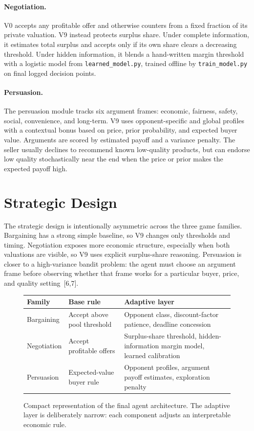 \documentclass{article}
\begin{document}
\paragraph{Negotiation.}
V0 accepts any profitable offer and otherwise counters from a fixed fraction of its private valuation. V9 instead protects surplus share. Under complete information, it estimates total surplus and accepts only if its own share clears a decreasing threshold. Under hidden information, it blends a hand-written margin threshold with a logistic model from \texttt{learned\_model.py}, trained offline by \texttt{train\_model.py} on final logged decision points.

\paragraph{Persuasion.}
The persuasion module tracks six argument frames: economic, fairness, safety, social, convenience, and long-term. V9 uses opponent-specific and global profiles with a contextual bonus based on price, prior probability, and expected buyer value. Arguments are scored by estimated payoff and a variance penalty. The seller usually declines to recommend known low-quality products, but can endorse low quality stochastically near the end when the price or prior makes the expected payoff high.

\section{Strategic Design}

The strategic design is intentionally asymmetric across the three game families. Bargaining has a strong simple baseline, so V9 changes only thresholds and timing. Negotiation exposes more economic structure, especially when both valuations are visible, so V9 uses explicit surplus-share reasoning. Persuasion is closer to a high-variance bandit problem: the agent must choose an argument frame before observing whether that frame works for a particular buyer, price, and quality setting~[6,7].

\begin{figure}[t]
\centering
\small
\begin{tabular}{>{\raggedright\arraybackslash}p{1.05in}>{\raggedright\arraybackslash}p{1.25in}p{2.95in}}
\toprule
Family & Base rule & Adaptive layer \\
\midrule
Bargaining & Accept above pool threshold & Opponent class, discount-factor patience, deadline concession \\
Negotiation & Accept profitable offers & Surplus-share threshold, hidden-information margin model, learned calibration \\
Persuasion & Expected-value buyer rule & Opponent profiles, argument payoff estimates, exploration penalty \\
\bottomrule
\end{tabular}
\caption{Compact representation of the final agent architecture. The adaptive layer is deliberately narrow: each component adjusts an interpretable economic rule.}
\label{fig:architecture}
\end{figure}
\end{document}
